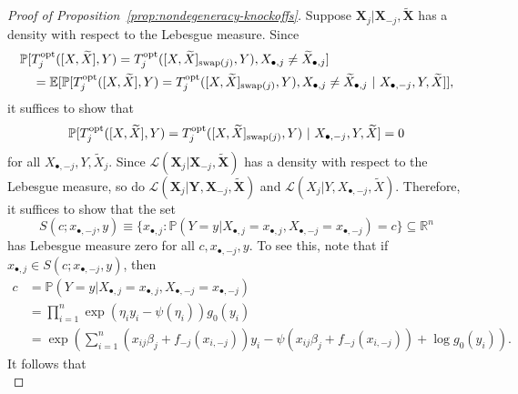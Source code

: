 \documentclass[ejs]{imsart}
\numberwithin{equation}{section}
\theoremstyle{plain}
\theoremstyle{definition}
\theoremstyle{remark}
\newcommand{\prx}{\bm X}
\newcommand{\srx}{X}
\newcommand{\sfx}{x}
\newcommand{\prxk}{{{\widetilde{\bm X}}}}
\newcommand{\srxk}{\widetilde X}
\newcommand{\pry}{{\bm Y}}
\newcommand{\sry}{Y}
\newcommand{\sfy}{y}
\begin{document}
\begin{proof}[Proof of Proposition~\ref{prop:nondegeneracy-knockoffs}]
	
	Suppose $\prx_{j}|\prx_{-j}, \prxk$ has a density with respect to the Lebesgue measure. Since
	\begin{equation*}
	\begin{split}
	&\mathbb P[T^{\textnormal{opt}}_j([\srx, \srxk], \sry) = T^{\textnormal{opt}}_j([\srx, \srxk]_{\textnormal{swap}(j)}, \sry), \srx_{\bullet,j} \neq \srxk_{\bullet,j}] \\
	&\quad= \mathbb E[\mathbb P[T^{\textnormal{opt}}_j([\srx, \srxk], \sry) = T^{\textnormal{opt}}_j([\srx, \srxk]_{\textnormal{swap}(j)}, \sry), \srx_{\bullet,j} \neq \srxk_{\bullet,j}\ |\ \srx_{\bullet,-j}, \sry, \srxk]],
	\end{split}
	\end{equation*}
	it suffices to show that 
	\begin{equation*}
	\mathbb P[T^{\textnormal{opt}}_j([\srx, \srxk], \sry) = T^{\textnormal{opt}}_j([\srx, \srxk]_{\textnormal{swap}(j)}, \sry)\ |\ \srx_{\bullet,-j}, \sry, \srxk] = 0
	\end{equation*}
	for all $\srx_{\bullet,-j}, \sry, \srxk_j$. Since $\mathcal L(\prx_j|\prx_{-j}, \prxk)$ has a density with respect to the Lebesgue measure, so do $\mathcal L(\prx_j|\pry, \prx_{-j}, \prxk)$ and $\mathcal L(\srx_j|\sry,  \srx_{\bullet,-j}, \srxk)$. Therefore, it suffices to show that the set
	\begin{equation*}
	S(c; \sfx_{\bullet,-j}, \sfy) \equiv \{x_{\bullet,j} : \mathbb P(\sry = \sfy|\srx_{\bullet,j} = \sfx_{\bullet,j}, \srx_{\bullet,-j} = \sfx_{\bullet,-j}) = c\} \subseteq \mathbb R^{n}
	\end{equation*}
	has Lebesgue measure zero for all $c, \sfx_{\bullet,-j}, \sfy$. To see this, note that if $\sfx_{\bullet,j} \in S(c; \sfx_{\bullet,-j}, \sfy)$, then
	\begin{equation*}
	\begin{split}
	c &= \mathbb P(\sry = \sfy|\srx_{\bullet,j} = \sfx_{\bullet,j}, \srx_{\bullet,-j} = \sfx_{\bullet,-j})\\
	&= \prod_{i = 1}^n \exp(\eta_i \sfy_i - \psi(\eta_i))g_0(\sfy_i) \\
	&= \exp\left(\sum_{i = 1}^n (x_{ij}\beta_j  + f_{-j}(\sfx_{i,-j}))\sfy_i - \psi(\sfx_{ij}\beta_j  + f_{-j}(\sfx_{i,-j})) + \log g_0(\sfy_i) \right).
	\end{split}
	\end{equation*}
	It follows that
	\begin{equation}

\end{equation}
\end{proof}
\end{document}
